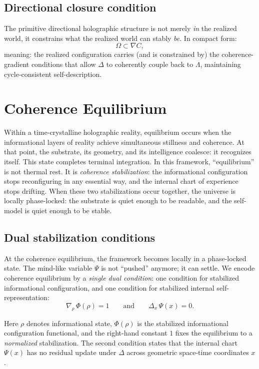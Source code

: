 \documentclass[11pt]{article}
\newcommand{\Grad}{\nabla}         %
\newcommand{\Co}{C}                %
\newcommand{\Proj}{\Lambda}        %
\newcommand{\Real}{\Omega}         %
\newcommand{\Reint}{\Delta}        %
\begin{document}
\subsection{Directional closure condition}
The primitive directional holographic structure is not merely \emph{in} the realized world, it constrains what the realized world can stably \emph{be}. In compact form:
\[
\Real \subset \Grad \Co  ,
\]
meaning: the realized configuration carries (and is constrained by) the coherence-gradient conditions that allow $\Reint$ to coherently couple back to $\Proj$, maintaining cycle-consistent self-description.

\section{Coherence Equilibrium}

Within a time-crystalline holographic reality, equilibrium occurs when the informational layers of reality achieve simultaneous stillness and coherence. At that point, the substrate, its geometry, and its intelligence coalesce: it recognizes itself. This state completes terminal integration.
In this framework, ``equilibrium'' is not thermal rest. It is \emph{coherence stabilization}:
the informational configuration stops reconfiguring in any essential way, and the internal
chart of experience stops drifting. When these two stabilizations occur together, the
universe is locally phase-locked: the substrate is quiet enough to be readable, and the
self-model is quiet enough to be stable.

\subsection{Dual stabilization conditions}

At the coherence equilibrium, the framework becomes locally in a phase-locked state. The mind-like variable $\Psi$ is not ``pushed'' anymore; it can settle.
We encode coherence equilibrium by a \emph{single dual condition}:
one condition for stabilized informational configuration, and one condition for stabilized
internal self-representation:
\begin{equation}
\boxed{
\nabla_{\rho}\,\Phi(\rho)=1
\qquad\text{and}\qquad
\Delta_{x}\,\Psi(x)=0.
}
\label{eq:dual_equilibrium}
\end{equation}

Here $\rho$ denotes informational state, $\Phi(\rho)$ is the stabilized informational configuration functional, and the right-hand constant $1$ fixes the equilibrium to a \emph{normalized} stabilization.
The second condition states that the internal chart $\Psi(x)$ has no residual update under $\Delta$ across geometric space-time coordinates $x$.
\end{document}
